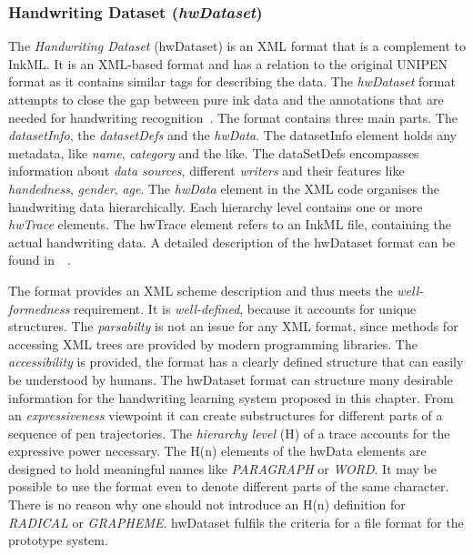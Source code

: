 \subsubsection{Handwriting Dataset (\emph{hwDataset})}
\label{sec:hwre:hwdataset}

The \emph{Handwriting Dataset} (hwDataset) is an XML format that is a complement
to InkML. It is an XML-based format and has a relation to the original 
UNIPEN format as it contains similar tags for describing the data. 
The \emph{hwDataset} format attempts to close the gap between pure ink data and 
the annotations that are needed for handwriting 
recognition~. 
The format contains three main parts. The \emph{datasetInfo}, 
the \emph{datasetDefs} and the \emph{hwData}. The datasetInfo element holds
any metadata, like \emph{name}, \emph{category} and the like.
The dataSetDefs encompasses information about \emph{data sources}, different
\emph{writers} and their features like \emph{handedness}, \emph{gender}, 
\emph{age}. The \emph{hwData} element in the XML code organises the 
handwriting data hierarchically. Each hierarchy level contains one or 
more \emph{hwTrace} elements. The hwTrace element refers to an InkML file, 
containing the actual handwriting data. A detailed description of the hwDataset 
format can be found in~~\citeyear{Bhaskarabhatla2004}. 

The format provides an XML scheme description and thus meets the 
\emph{well-formedness} requirement. It is \emph{well-defined}, 
because it accounts for unique structures. The \emph{parsabilty} is not an 
issue for any XML format, since methods for accessing XML trees are provided 
by modern programming libraries.
The \emph{accessibility} is provided, the format has a clearly defined structure
that can easily be understood by humans.
The hwDataset format can structure many desirable information for the handwriting
learning system proposed in this chapter. 
From an \emph{expressiveness} viewpoint it can create substructures for 
different parts of a sequence of pen trajectories. The \emph{hierarchy level} (H)
of a trace accounts for the expressive power necessary. The H(n) elements 
of the hwData elements are designed to hold meaningful names like 
\emph{PARAGRAPH} or \emph{WORD}. It may be possible to use the format even to 
denote different parts of the same character. There is no reason why one should
not introduce an H(n) definition for \emph{RADICAL} or \emph{GRAPHEME}.
hwDataset fulfils the criteria for a file format for the prototype system.

